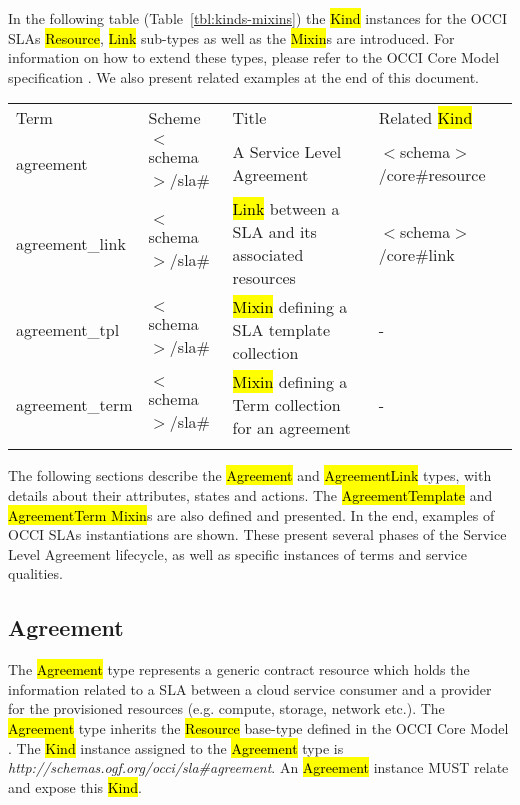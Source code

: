 \documentclass[10pt,a4paper]{article}
\begin{document}
In the following table (Table~\ref{tbl:kinds-mixins}) the \hl{Kind} instances for the OCCI SLAs \hl{Resource}, \hl{Link} sub-types as well as the \hl{Mixin}s are introduced. For information on how to extend these types, please refer to the OCCI Core Model specification \cite{occi:core}. We also present related examples at the end of this document. 


	{
	\begin{tabular}{llll}
	\toprule
	Term & Scheme & Title & Related \hl{Kind} \\
	\colrule
	agreement &  $<$schema$>$/sla\# & A Service Level Agreement	& $<$schema$>$/core\#resource \\
	agreement\_link & $<$schema$>$/sla\# & \hl{Link} between a SLA and its associated resources	& $<$schema$>$/core\#link \\
	agreement\_tpl & $<$schema$>$/sla\# & \hl{Mixin} defining a SLA template collection	& - \\
	agreement\_term & $<$schema$>$/sla\# & \hl{Mixin} defining a Term collection for an agreement	& - \\
	\botrule
	\end{tabular}
}



The following sections describe the \hl{Agreement} and \hl{AgreementLink} types, with details about their attributes, states and actions. The \hl{AgreementTemplate} and \hl{AgreementTerm Mixin}s are also defined and presented. In the end, examples of OCCI SLAs instantiations are shown. These present several phases of the Service Level Agreement lifecycle, as well as specific instances of terms and service qualities. 



\subsection{Agreement}

The \hl{Agreement} type represents a generic contract resource which holds the information related to a SLA between a cloud service consumer and a provider for the provisioned resources (e.g. compute, storage, network etc.). The \hl{Agreement} type inherits the \hl{Resource} base-type defined in the OCCI Core Model \cite{occi:core}. The \hl{Kind} instance assigned to the \hl{Agreement} type is \textit{http://schemas.ogf.org/occi/sla\#agreement}. An \hl{Agreement} instance MUST relate and expose this \hl{Kind}.
\end{document}
